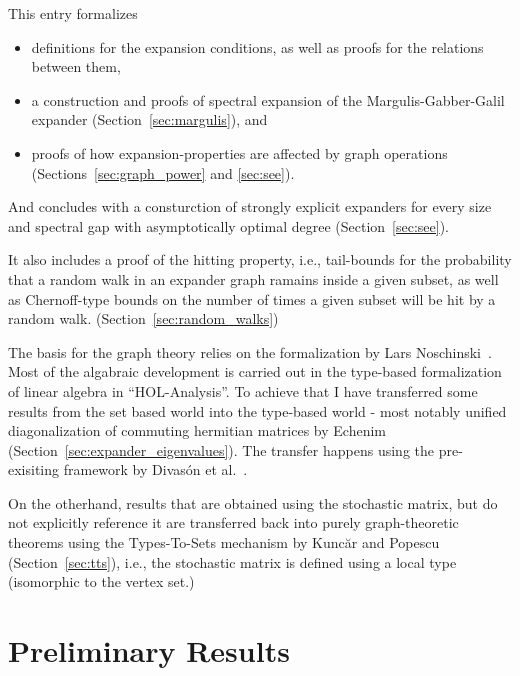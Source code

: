 \documentclass[11pt,a4paper]{article}
\begin{document}
This entry formalizes 
\begin{itemize}
\item definitions for the expansion conditions, as well as proofs for the relations between them,
\item a construction and proofs of spectral expansion of the Margulis-Gabber-Galil expander 
  (Section~\ref{sec:margulis}), and
\item proofs of how expansion-properties are affected by graph operations
(Sections~\ref{sec:graph_power} and \ref{sec:see}).
\end{itemize}
And concludes with a consturction of strongly explicit expanders for every size and 
spectral gap with asymptotically optimal degree (Section~\ref{sec:see}). 

It also includes a proof of the hitting property, i.e., tail-bounds for the probability that a 
random walk in an expander graph ramains inside a given subset, as well as Chernoff-type bounds on 
the number of times a given subset will be hit by a random walk. (Section~\ref{sec:random_walks})

The basis for the graph theory relies on the formalization by 
Lars Noschinski~\cite{Graph_Theory-AFP}. Most of the algabraic development is carried out in the
type-based formalization of linear algebra in ``HOL-Analysis''. To achieve that I have transferred 
some  results from the set based world into the type-based world - most notably unified 
diagonalization of commuting hermitian matrices by Echenim~\cite{Commuting_Hermitian-AFP} 
(Section~\ref{sec:expander_eigenvalues}). The transfer happens using the pre-exisiting framework by 
Divas\'{o}n et al.~\cite{Perron_Frobenius-AFP}.

On the otherhand, results that are obtained using the stochastic matrix, but do not explicitly 
reference it are transferred back into purely graph-theoretic theorems using the Types-To-Sets 
mechanism by Kunc\u{a}r and Popescu~\cite{kuncar2016} (Section~\ref{sec:tts}), i.e., the stochastic
matrix is defined using a local type (isomorphic to the vertex set.)

\section{Preliminary Results}




\end{document}
